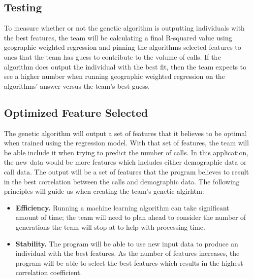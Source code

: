 \documentclass[onecolumn, draftclsnofoot,10pt, compsoc]{IEEEtran}
\begin{document}
\begin{singlespace}
\subsection{Testing} \label{MLtesting}
To measure whether or not the genetic algorithm is outputting individuals with the best features, the team will be calculating a final R-squared value using geographic weighted regression and pinning the algorithms selected features to ones that the team has guess to contribute to the volume of calls.
If the algorithm does output the individual with the best fit, then the team expects to see a higher number when running geographic weighted regression on the algorithms' answer versus the team's best guess.

\subsection{Optimized Feature Selected}
    The genetic algorithm will output a set of features that it believes to be optimal when trained using the regression model.
    With that set of features, the team will be able include it when trying to predict the number of calls.
    In this application, the new data would be more features which includes either demographic data or call data.
    The output will be a set of features that the program believes to result in the best correlation between the calls and demographic data.
    The following principles will guide us when creating the team's genetic algirhtm:
    \begin{itemize}
        \item \textbf{Efficiency.} Running a machine learning algorithm can take significant amount of time; the team will need to plan ahead to consider the number of generations the team will stop at to help with processing time.
        \item \textbf{Stability.} The program will be able to use new input data to produce an individual with the best features. As the number of features increases, the program will be able to select the best features which results in the highest correlation coefficient.
    \end{itemize}

\end{singlespace}
\end{document}
